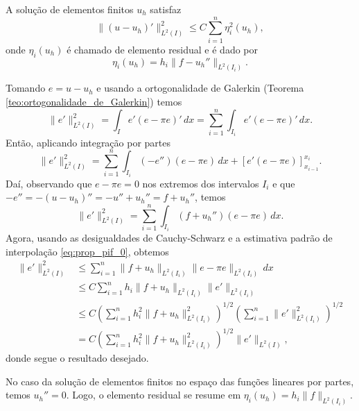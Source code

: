 \begin{teo}\label{teo:fem_est_a_posteriori}
  A solução de elementos finitos $u_h$ satisfaz
  \begin{equation}
    \|(u-u_h)'\|_{L^2(I)}^2 \leq C\sum_{i=1}^n \eta_i^2(u_h),
  \end{equation}
onde $\eta_i(u_h)$ é chamado de elemento residual e é dado por
\begin{equation}
  \eta_i(u_h) = h_i\|f - u_h''\|_{L^2(I_i)}.
\end{equation}
\end{teo}
\begin{dem}
  Tomando $e = u - u_h$ e usando a ortogonalidade de Galerkin (Teorema \ref{teo:ortogonalidade_de_Galerkin}) temos
  \begin{equation}
    \|e'\|_{L^2(I)}^2 = \int_I e'(e-\pi e)'\,dx = \sum_{i=1}^n\int_{I_i} e'(e-\pi e)'\,dx.
  \end{equation}
  Então, aplicando integração por partes
  \begin{equation}
    \|e'\|_{L^2(I)}^2 = \sum_{i=1}^n\int_{I_i}(-e'')(e-\pi e)\,dx + [e'(e-\pi e)]_{x_{i-1}}^{x_i}.
  \end{equation}
  Daí, observando que $e-\pi e = 0$ nos extremos dos intervalos $I_i$ e que $-e'' = -(u-u_h)'' = -u'' + u_h'' = f + u_h''$, temos
  \begin{equation}
    \|e'\|_{L^2(I)}^2 = \sum_{i=1}^n\int_{I_i}(f+u_h'')(e-\pi e)\,dx.
  \end{equation}
  Agora, usando as desigualdades de Cauchy-Schwarz e a estimativa padrão de interpolação \eqref{eq:prop_pif_0}, obtemos
  \begin{align}
    \|e'\|_{L^2(I)}^2 &\leq \sum_{i=1}^n\|f+u_h\|_{L^2(I_i)}\|e-\pi e\|_{L^2(I_i)}\,dx\\
    &\leq C\sum_{i=1}^nh_i\|f+u_h\|_{L^2(I_i)}\|e'\|_{L^2(I_i)}\\
    &\leq C\left(\sum_{i=1}^n h_i^2\|f+u_h\|_{L^2(I_i)}^2\right)^{1/2}\left(\sum_{i=1}^n \|e'\|_{L^2(I_i)}^2\right)^{1/2}\\
    &= C\left(\sum_{i=1}^n h_i^2\|f+u_h\|_{L^2(I_i)}^2\right)^{1/2}\|e'\|_{L^2(I)},
  \end{align}
  donde segue o resultado desejado.
\end{dem}

\begin{obs}
  No caso da solução de elementos finitos no espaço das funções lineares por partes, temos $u_h'' = 0$. Logo, o elemento residual se resume em $\eta_i(u_h) = h_i\|f\|_{L^2(I_i)}$.
\end{obs}

